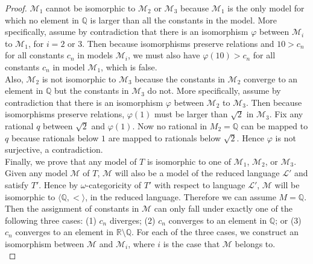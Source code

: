 \documentclass{article}
\begin{document}
\begin{enumerate}[label={\bf Q\arabic*:}]
\begin{enumerate}
\begin{proof}
          $\mathcal{M}_1$ cannot be isomorphic to $\mathcal{M}_2$ or
          $\mathcal{M}_3$ because $\mathcal{M}_1$ is the only model for
          which no element in $\mathbb{Q}$ is larger than all the constants
          in the model. More specifically, assume by contradiction that
          there is an isomorphism $\varphi$ between $\mathcal{M}_i$ to
          $\mathcal{M}_1$, for $i=2$ or $3$. Then because isomorphisms
          preserve relations and $10>c_n$ for all constants $c_n$ in models
          $\mathcal{M}_i$, we must also have $\varphi(10)>c_n$ for all
          constants $c_n$ in model $\mathcal{M}_1$, which is false. \\

          Also, $\mathcal{M}_2$ is not isomorphic to $\mathcal{M}_3$
          because the constants in $\mathcal{M}_2$ converge to an element
          in $\mathbb{Q}$ but the constants in $\mathcal{M}_3$ do not.
          More specifically, assume by contradiction that there is an
          isomorphism $\varphi$ between $\mathcal{M}_2$ to $\mathcal{M}_3$.
          Then because isomorphisms preserve relations, $\varphi(1)$ must
          be larger than $\sqrt{2}$ in $\mathcal{M}_3$. Fix any rational
          $q$ between $\sqrt{2}$ and $\varphi(1)$. Now no rational in
          $M_2=\mathbb{Q}$ can be mapped to $q$ because rationals below $1$
          are mapped to rationals below $\sqrt{2}$. Hence $\varphi$ is not
          surjective, a contradiction. \\

          Finally, we prove that any model of $T$ is isomorphic to one of
          $\mathcal{M}_1$, $\mathcal{M}_2$, or $\mathcal{M}_3$. Given any
          model $\mathcal{M}$ of $T$, $\mathcal{M}$ will also be a model of
          the reduced language $\mathcal{L}'$ and satisfy $T'$. Hence by
          $\omega$-categoricity of $T'$ with respect to language
          $\mathcal{L}'$, $\mathcal{M}$ will be isomorphic to
          $\langle\mathbb{Q},<\rangle$, in the reduced language. Therefore
          we can assume $M=\mathbb{Q}$. Then the assignment of constants in
          $\mathcal{M}$ can only fall under exactly one of the following
          three cases: (1) $c_n$ diverges; (2) $c_n$ converges to an
          element in $\mathbb{Q}$; or (3) $c_n$ converges to an element in
          $\mathbb{R}\setminus\mathbb{Q}$. For each of the three cases, we
          construct an isomorphism between $\mathcal{M}$ and
          $\mathcal{M}_i$, where $i$ is the case that $\mathcal{M}$ belongs
          to. \\


\end{proof}
\end{enumerate}
\end{enumerate}
\end{document}
